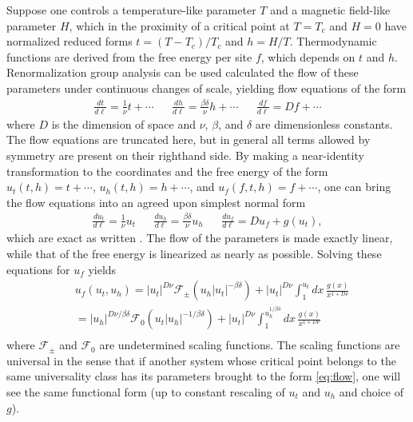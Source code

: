 \documentclass[
  aps,
  pre,
  preprint,
  longbibliography,
  floatfix
]{revtex4-2}
\begin{document}
Suppose one controls a temperature-like parameter $T$ and a magnetic field-like
parameter $H$, which in the proximity of a critical point at $T=T_c$ and $H=0$
have normalized reduced forms $t=(T-T_c)/T_c$ and $h=H/T$. Thermodynamic
functions are derived from the free energy per site $f$, which depends on $t$
and $h$. Renormalization group analysis can be used calculated the flow of
these parameters under continuous changes of scale, yielding flow equations of
the form
\begin{align} \label{eq:raw.flow}
  \frac{dt}{d\ell}=\frac1\nu t+\cdots
  &&
  \frac{dh}{d\ell}=\frac{\beta\delta}\nu h+\cdots
  &&
  \frac{df}{d\ell}=Df+\cdots
\end{align}
where $D$ is the dimension of space and $\nu$, $\beta$, and $\delta$ are
dimensionless constants. The flow equations are truncated here, but in general
all terms allowed by symmetry are present on their righthand side. By making a
near-identity transformation to the coordinates and the free energy of the form
$u_t(t, h)=t+\cdots$, $u_h(t, h)=h+\cdots$, and $u_f(f,t,h)=f+\cdots$, one can
bring the flow equations into an agreed upon simplest normal form
\begin{align} \label{eq:flow}
  \frac{du_t}{d\ell}=\frac1\nu u_t
  &&
  \frac{du_h}{d\ell}=\frac{\beta\delta}\nu u_h
  &&
  \frac{du_f}{d\ell}=Du_f+g(u_t),
\end{align}
which are exact as written \cite{Raju_2019_Normal}. The flow of the parameters is made exactly linear,
while that of the free energy is linearized as nearly as possible. Solving these equations for $u_f$ yields
\begin{equation}
  \begin{aligned}
    &u_f(u_t, u_h)
    =|u_t|^{D\nu}\mathcal F_\pm(u_h|u_t|^{-\beta\delta})+|u_t|^{D\nu}\int_1^{u_t}dx\,\frac{g(x)}{x^{1+D\nu}} \\
    &=|u_h|^{D\nu/\beta\delta}\mathcal F_0(u_t|u_h|^{-1/\beta\delta})+|u_t|^{D\nu}\int_1^{u_h^{1/\beta\delta}}dx\,\frac{g(x)}{x^{1+D\nu}} \\
  \end{aligned}
\end{equation}
where $\mathcal F_\pm$ and $\mathcal F_0$ are undetermined scaling functions.
The scaling functions are universal in the sense that if another system whose
critical point belongs to the same universality class has its parameters
brought to the form \eqref{eq:flow}, one will see the same functional form (up
to constant rescaling of $u_t$ and $u_h$ and choice of $g$).
\end{document}
